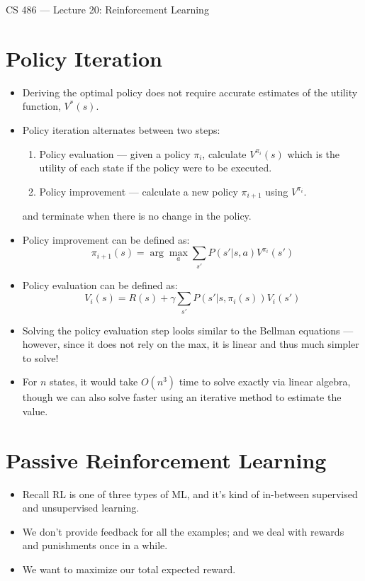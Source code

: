 \documentclass{article}
\author{Clement Tsang}
\begin{document}
\begin{center}
    \Large{CS 486 --- Lecture 20: Reinforcement Learning}
\end{center}

\section{Policy Iteration}
\begin{itemize}
    \item Deriving the optimal policy does not require accurate estimates of the utility function, $V^*(s)$.
    \item Policy iteration alternates between two steps:
        \begin{enumerate}
            \item Policy evaluation --- given a policy $\pi_i$, calculate $V^{\pi_i}(s)$ which is the utility of each state if the policy were to be executed.
            \item Policy improvement --- calculate a new policy $\pi_{i+1}$ using $V^{\pi_i}$.
        \end{enumerate}
        and terminate when there is no change in the policy.
    \item Policy improvement can be defined as:
        \[
            \pi_{i+1}(s) = \arg \max_a \sum_{s'} P(s' | s, a) V^{\pi_i}(s')
        \]
    \item Policy evaluation can be defined as:
        \[
            V_i(s) = R(s) + \gamma \sum_{s'}P(s' | s, \pi_i(s)) V_i(s')
        \]
    \item Solving the policy evaluation step looks similar to the Bellman equations --- however, since it does not rely on the max, it is linear and thus much simpler to solve!
    \item For $n$ states, it would take $O(n^3)$ time to solve exactly via linear algebra, though we can also solve faster using an iterative method to estimate the value.
\end{itemize}

\section{Passive Reinforcement Learning}
\begin{itemize}
    \item Recall RL is one of three types of ML, and it's kind of in-between supervised and unsupervised learning.
    \item We don't provide feedback for all the examples; and we deal with rewards and punishments once in a while.
    \item We want to maximize our total expected reward.
\end{itemize}
\end{document}
